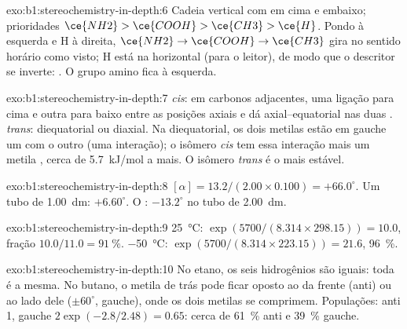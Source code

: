 \begin{solution}{exo:b1:stereochemistry-in-depth:6}
Cadeia vertical com  em cima e  embaixo; prioridades
$\ce{NH2} > \ce{COOH} > \ce{CH3} > \ce{H}$. Pondo  à esquerda e H
à direita, $\ce{NH2} \to \ce{COOH} \to \ce{CH3}$ gira no sentido horário
como visto; H está na horizontal (para o leitor), de modo que o
descritor se inverte: . O grupo amino fica à esquerda.
\end{solution}

\begin{solution}{exo:b1:stereochemistry-in-depth:7}
\textit{cis}: em carbonos adjacentes, uma ligação para cima e outra para
baixo entre as posições axiais e  dá axial--equatorial nas
duas . \textit{trans}: diequatorial ou diaxial. Na 
diequatorial, os dois metilas estão em gauche um com o outro (uma
interação); o isômero \textit{cis} tem essa interação mais um metila
, cerca de \qty{5.7}{kJ/mol} a mais. O isômero \textit{trans} é o
mais estável.
\end{solution}

\begin{solution}{exo:b1:stereochemistry-in-depth:8}
$[\alpha] = 13.2/(2.00 \times 0.100) = +66.0^\circ$. Um tubo de
\qty{1.00}{dm}: $+6.60^\circ$. O : $-13.2^\circ$ no tubo de
\qty{2.00}{dm}.
\end{solution}

\begin{solution}{exo:b1:stereochemistry-in-depth:9}
\qty{25}{\celsius}: $\exp(5700/(8.314 \times 298.15)) = 10.0$, fração
$10.0/11.0 = \qty{91}{\percent}$. \qty{-50}{\celsius}: $\exp(5700/(8.314
\times 223.15)) = 21.6$, \qty{96}{\percent}.
\end{solution}

\begin{solution}{exo:b1:stereochemistry-in-depth:10}
No etano, os seis hidrogênios são iguais: toda  é a
mesma. No butano, o metila de trás pode ficar oposto ao da frente (anti)
ou ao lado dele ($\pm 60^\circ$, gauche), onde os dois metilas se
comprimem. Populações: anti 1, gauche $2\exp(-2.8/2.48) = 0.65$: cerca
de \qty{61}{\percent} anti e \qty{39}{\percent} gauche.
\end{solution}

